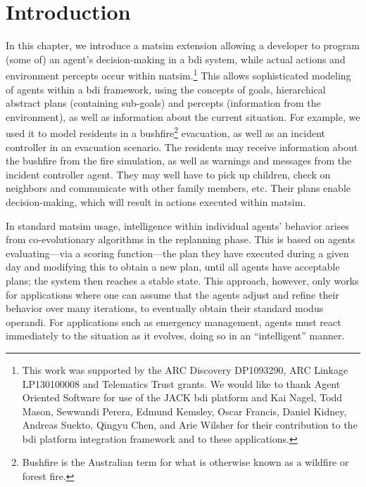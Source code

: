 \section{Introduction}
\label{sec:bdi-intro}
In this chapter, we introduce a \gls{matsim} extension allowing a
developer to program (some of) an agent's decision-making in a \gls{bdi} system, while actual actions and
environment percepts occur within \gls{matsim}.\footnote{This work was supported by the ARC Discovery DP1093290,  ARC Linkage LP130100008 and Telematics Trust grants. We would like to thank Agent Oriented Software for use of the JACK \gls{bdi} platform and Kai Nagel, Todd Mason, Sewwandi Perera, Edmund Kemsley, Oscar Francis, Daniel Kidney, Andreas Suekto, Qingyu Chen, and Arie Wilsher for their contribution to the \gls{bdi} platform integration framework and to these applications.} 
This allows
sophisticated modeling of agents within a \gls{bdi}
framework, using the concepts of goals, hierarchical abstract plans
(containing sub-goals) and percepts (information from the
environment), as well as information about the current situation. For
example, we used it to model residents in a 
bushfire\footnote{Bushfire is the Australian term for what is
  otherwise known as a wildfire or forest fire.} evacuation, as well as an incident controller in an evacuation
scenario. The residents may receive information about the bushfire from
the fire simulation, as well as warnings and messages from the incident
controller agent. They may well have to
pick up children, check on neighbors and communicate with
other family members, etc. Their plans enable
decision-making, which will result in actions 
executed within \gls{matsim}.

In standard \gls{matsim} usage, intelligence within individual agents' behavior 
arises from co-evolutionary algorithms in
the replanning phase. This is based on agents evaluating---via a scoring
function---the plan they have executed during a given day and
modifying this to obtain a new plan, until all agents have acceptable
plans; the system then reaches a stable state. This approach, however,
only works for applications where one can assume that the agents
adjust and refine their behavior over many iterations, to eventually
obtain their standard modus operandi. For applications such as
emergency management, agents must react immediately to the situation
as it evolves, doing so in an ``intelligent'' manner. 

